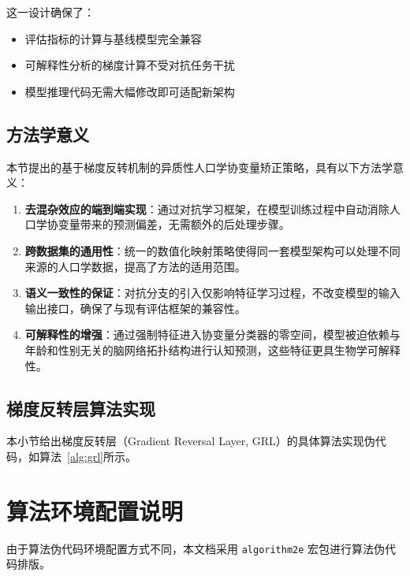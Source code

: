 \documentclass[UTF8, a4paper, 12pt]{article}
\begin{document}
这一设计确保了：
\begin{itemize}
    \item 评估指标的计算与基线模型完全兼容
    \item 可解释性分析的梯度计算不受对抗任务干扰
    \item 模型推理代码无需大幅修改即可适配新架构
\end{itemize}

\subsection{方法学意义}

本节提出的基于梯度反转机制的异质性人口学协变量矫正策略，具有以下方法学意义：

\begin{enumerate}
    \item \textbf{去混杂效应的端到端实现}：通过对抗学习框架，在模型训练过程中自动消除人口学协变量带来的预测偏差，无需额外的后处理步骤。

    \item \textbf{跨数据集的通用性}：统一的数值化映射策略使得同一套模型架构可以处理不同来源的人口学数据，提高了方法的适用范围。

    \item \textbf{语义一致性的保证}：对抗分支的引入仅影响特征学习过程，不改变模型的输入输出接口，确保了与现有评估框架的兼容性。

    \item \textbf{可解释性的增强}：通过强制特征进入协变量分类器的零空间，模型被迫依赖与年龄和性别无关的脑网络拓扑结构进行认知预测，这些特征更具生物学可解释性。
\end{enumerate}

\subsection{梯度反转层算法实现}

本小节给出梯度反转层（Gradient Reversal Layer, GRL）的具体算法实现伪代码，如算法~\ref{alg:grl}所示。

\section*{算法环境配置说明}
由于算法伪代码环境配置方式不同，本文档采用 \texttt{algorithm2e} 宏包进行算法伪代码排版。
\end{document}

